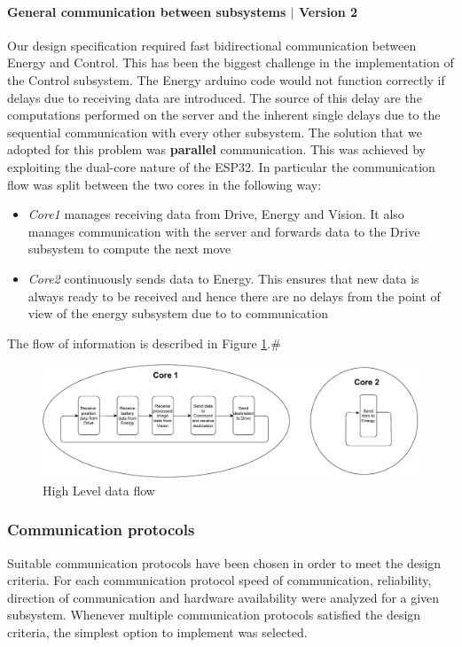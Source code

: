 \documentclass[10pt,twoside]{article}
\begin{document}
\paragraph{General communication between subsystems $\vert$ Version 2}
Our design specification required fast bidirectional communication between Energy and Control. This has been the biggest challenge in the implementation of the Control subsystem. The Energy arduino code would not function correctly if delays due to receiving data are introduced. The source of this delay are the computations performed on the server and the inherent single delays due to the sequential communication with every other subsystem. The solution that we adopted for this problem was \textbf{parallel} communication.
This was achieved by exploiting  the dual-core nature of the ESP32. In particular the communication flow was split between the two cores in the following way: 
\begin{itemize}
    \item \emph{Core1} manages receiving data from Drive, Energy and Vision. It also manages communication with the server and forwards data to the Drive subsystem to compute the next move
    \item \emph{Core2} continuously sends data to Energy. This ensures that new data is always ready to be received and hence there are no delays from the point of view of the energy subsystem due to to communication
\end{itemize}

The flow of information is described in Figure \ref{fig:DataFlowDualCore}.#



\begin{figure}[hbt!]
    \centering
    \includegraphics[scale=0.5]{esp32_flowchart.pdf}
    \captionsetup{justification=centering}
    \caption{High Level data flow}
    \label{fig:DataFlowDualCore}
\end{figure}


\subsubsection{Communication protocols} 
Suitable communication protocols have been chosen in order to meet the design criteria.
For each communication protocol speed of communication, reliability, direction of communication and hardware availability were analyzed for a given subsystem. Whenever multiple communication protocols satisfied the design criteria, the simplest option to implement was selected.
\end{document}
